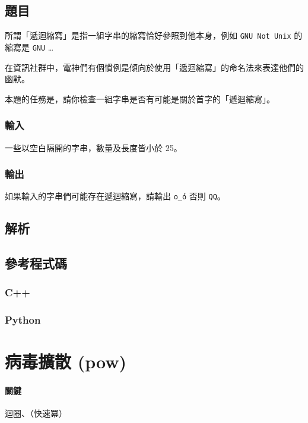 \documentclass[a4paper,10pt]{article}
\begin{document}
\subsection{題目}

所謂「遞迴縮寫」是指一組字串的縮寫恰好參照到他本身，例如 \texttt{GNU Not Unix} 的縮寫是 \texttt{GNU} \dots

在資訊社群中，電神們有個慣例是傾向於使用「遞迴縮寫」的命名法來表達他們的幽默。

本題的任務是，請你檢查一組字串是否有可能是關於首字的「遞迴縮寫」。

\subsubsection{輸入}

一些以空白隔開的字串，數量及長度皆小於 25。

\subsubsection{輸出}

如果輸入的字串們可能存在遞迴縮寫，請輸出 \texttt{o\'\_\'o} 否則 \texttt{QQ}。

\subsection{解析}

\subsection{參考程式碼}

\subsubsection{C++}



\subsubsection{Python}



\section{病毒擴散 (pow)}

\paragraph{關鍵} 迴圈、（快速冪）
\end{document}
